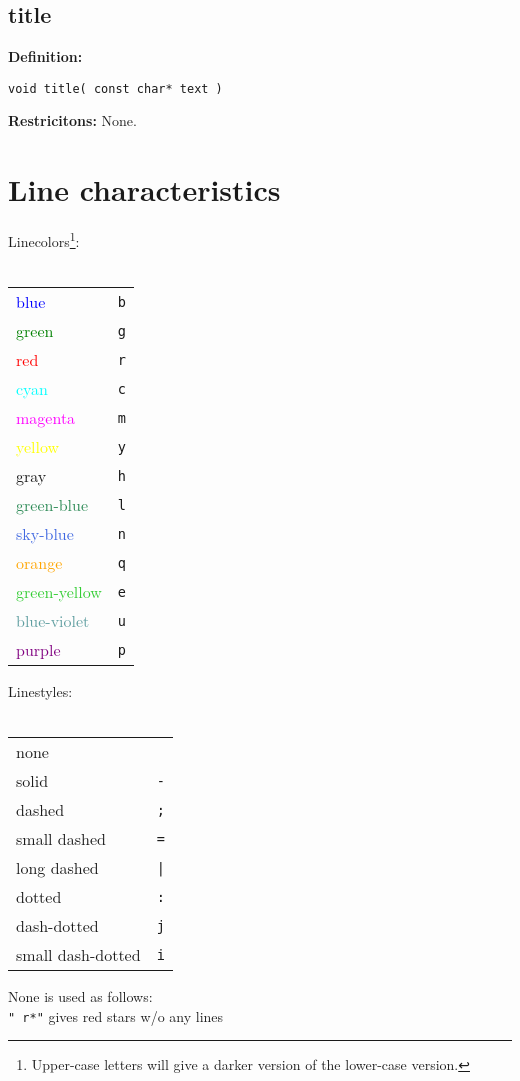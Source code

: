 \documentclass[a4paper]{article}
\newcommand{\command}[1]{\subsection{#1}}
\begin{document}
\command{title}

\textbf{Definition:}
\begin{lstlisting}
void title( const char* text )
\end{lstlisting}
%
\textbf{Restricitons:} None.

\section{Line characteristics}

\begin{minipage}{3cm}
  Linecolors\footnote{
  Upper-case letters will give a darker version of the lower-case version.
  }:\\ \\
  \begin{tabular}{l|c}
    \textcolor{blue}{blue} & \texttt{b} \\
    \textcolor{green}{green} & \texttt{g} \\
    \textcolor{red}{red} & \texttt{r} \\
    \textcolor{cyan}{cyan} & \texttt{c} \\
    \textcolor{magenta}{magenta} & \texttt{m} \\
    \textcolor{yellow}{yellow} & \texttt{y} \\
    \textcolor[gray]{0.5}{gray} & \texttt{h} \\
    \textcolor{SeaGreen}{green-blue} & \texttt{l} \\
    \textcolor{RoyalBlue}{sky-blue} & \texttt{n} \\
    \textcolor{orange}{orange} & \texttt{q} \\
    \textcolor{LimeGreen}{green-yellow} & \texttt{e} \\
    \textcolor{CadetBlue}{blue-violet} & \texttt{u} \\
    \textcolor{purple}{purple} & \texttt{p}
  \end{tabular}
\end{minipage}
\hfill
\begin{minipage}{4cm}
  Linestyles:\\ \\
  \begin{tabular}{l|c}
    none & \\
    solid & \texttt{-} \\
    dashed & \texttt{;} \\
    small dashed & \texttt{=} \\
    long dashed & \texttt{|} \\
    dotted & \texttt{:} \\
    dash-dotted & \texttt{j} \\
    small dash-dotted & \texttt{i} 
  \end{tabular}
  None is used as follows: \\
  \texttt{" r*"} gives red stars w/o any lines
\end{minipage}
\end{document}

